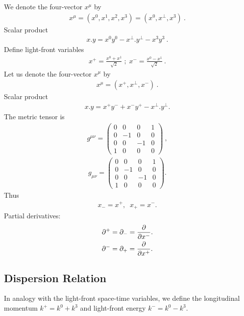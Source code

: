 \documentclass[12pt,a4paper]{report}
\begin{document}
We denote the four-vector ${x}^{\mu}$ by
\begin{align}
    {x}^{\mu} = (x^{0}, x^{1}, x^{2}, x^{3})  =  
(x^{0},x^{\perp},x^3)~.
\end{align}
Scalar product
\begin{align}
    {x}.{y}= x^{0} y^{0}- x^{\perp}.y^{\perp} - x^3 y^3 ~.
\end{align}
Define light-front variables
\begin{align}
	x^+=\frac{x^0+x^1}{\sqrt{2}}\;;\;x^-=\frac{x^0-x^1}{\sqrt{2}}~.
	\end{align}
Let us denote the four-vector $x^\mu$ by
\begin{align}
    x^{\mu} = (x^{+},x^{\perp},x^{-}) ~.
\end{align}
Scalar product
\begin{align}
    x.y =  x^{+}y^{-}+x^{-}y^{+}-
x^{\perp}.y^{\perp}  .
\end{align}
The metric tensor is
\begin{align}
    g^{\mu\nu}=\begin{pmatrix}
  0 &0&0& 1\\ 
  0&-1&0&0\\
  0&0&-1&0\\
  1 & 0&0&0
\end{pmatrix} ~,
\end{align}
\begin{align}
    g_{\mu \nu} = \begin{pmatrix}
  0 &0&0& 1\\ 
  0&-1&0&0\\
  0&0&-1&0\\
  1 & 0&0&0
\end{pmatrix} .
\end{align}
Thus
\begin{align}
    x_{-}= x^{+}  , \; \; x_{+} = x^{-} .
\end{align}
Partial derivatives:
\begin{align}
    \partial^{+}&=  \partial_{-}=  {\partial \over \partial x^{-}}.\\
     \partial^{-}&=  \partial_{+}=  {\partial \over \partial x^{+}}  .
\end{align}
\subsection{Dispersion Relation}
In analogy with the light-front space-time variables, we define the
longitudinal momentum $k^+=k^0+k^3$ and light-front energy $k^-=k^0 -k^3$. 
\end{document}
